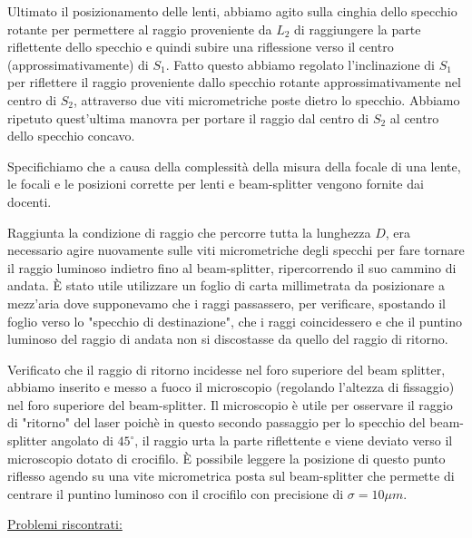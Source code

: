 \documentclass{article}
\begin{document}
\vspace{3mm}

Ultimato il posizionamento delle lenti, abbiamo agito sulla cinghia dello specchio rotante per permettere al raggio proveniente da $L_2$ di raggiungere la parte riflettente 
dello specchio e quindi subire una riflessione verso il centro (approssimativamente) di $S_1$.
Fatto questo abbiamo regolato l'inclinazione di $S_1$ per riflettere il raggio proveniente dallo specchio rotante approssimativamente nel centro di $S_2$, attraverso due
viti micrometriche poste dietro lo specchio. Abbiamo ripetuto quest'ultima manovra per portare il raggio dal centro di $S_2$ al centro dello specchio concavo.

Specifichiamo che a causa della complessità della misura della focale di una lente, le focali e le posizioni corrette per lenti e beam-splitter vengono fornite dai 
docenti.

\vspace{3mm}

Raggiunta la condizione di raggio che percorre tutta la lunghezza $D$, era necessario agire nuovamente sulle viti micrometriche degli specchi per fare tornare il raggio
luminoso indietro fino al beam-splitter, ripercorrendo il suo cammino di andata. È stato utile utilizzare un foglio di carta millimetrata da posizionare
a mezz'aria dove supponevamo che i raggi passassero, per verificare, spostando il foglio verso lo "specchio di destinazione", che i raggi coincidessero e che il puntino luminoso
del raggio di andata non si discostasse da quello del raggio di ritorno.

\vspace{3mm}

Verificato che il raggio di ritorno incidesse nel foro superiore del beam splitter, abbiamo inserito e messo a fuoco il microscopio (regolando l'altezza di fissaggio) nel
foro superiore del beam-splitter. Il microscopio è utile per osservare il raggio di "ritorno" del laser poichè in questo secondo passaggio per lo specchio del beam-splitter
angolato di $45^\circ$, il raggio urta la parte riflettente e viene deviato verso il microscopio dotato di crocifilo. È possibile leggere la posizione di questo punto 
riflesso agendo su una vite micrometrica posta sul beam-splitter che permette di centrare il puntino luminoso con il crocifilo con precisione di $\sigma = 10 \mu m$.

\vspace{3mm}

\underline{Problemi riscontrati:} 
\end{document}
